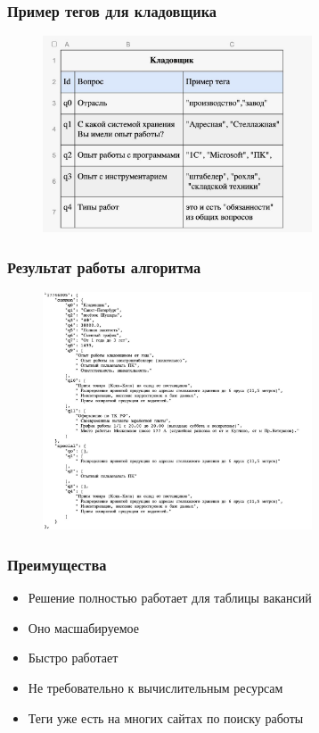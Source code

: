 \documentclass[xcolor=table,xetex,mathserif,serif]{beamer}
\begin{document}
\begin{frame}
	\frametitle{Пример тегов для кладовщика}

	\begin{figure}[t]
		\includegraphics[width=8cm]{"./images/sample.jpg"}
		\centering
	\end{figure}
\end{frame}


\begin{frame}
	\frametitle{Результат работы алгоритма}

	\begin{figure}[t]
		\includegraphics[width=8cm]{"./images/result.jpg"}
		\centering
	\end{figure}
\end{frame}


\begin{frame}
	\frametitle{Преимущества}

	\begin{itemize}
		\item Решение полностью работает для таблицы вакансий
		\item Оно масшабируемое
		\item Быстро работает
        \item Не требовательно к вычислительным ресурсам
		\item Теги уже есть на многих сайтах по поиску работы
	\end{itemize}
\end{frame}
\end{document}
